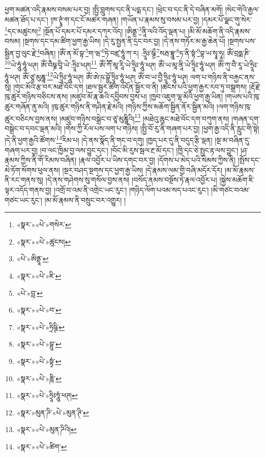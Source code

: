 ཕྱག་མཚན་འདི་རྣམས་བསམ་པར་བྱ། །སྤྱི་བླུགས་དང་ནི་པདྨ་དང་། །ཕྲེང་བ་དང་ནི་དེ་བཞིན་མགོ། །སེང་གེའི་རྒྱལ་མཚན་ཐོད་པ་དང་། །ཁ་ཊྭཱཾ་ག་དང་ངོ་མཚར་གཞན། །གཡོན་པ་རྣམས་སུ་བསམ་པར་བྱ། །དམར་པོ་ལྗང་གུ་སེར་\footnote{«སྣར་»«པེ་»གསེར་}དང་མཚུངས།\footnote{«སྣར་»«པེ་»ཚུངས།} །སྔོན་པོ་དམར་པོ་དམར་དཀར་འོད། །ཨིནྡྲ་\footnote{«པེ་»ཨིནྡཱ་}ནཱི་ལའི་འོད་ལྡན་པ། །མི་མོ་མཆོག་ནི་འདི་རྣམས་བསམ། །སྔགས་དང་དམ་ཚིག་ཕྱག་རྒྱ་ཡིས། །དེ་རུ་སྤྱན་ནི་དྲང་བར་བྱ། །དེ་ནས་གཏོར་མ་རྒྱ་ཆེན་པོ། །སྔགས་པས་སྦྱིན་བྱ་ལུང་རྗེ་\footnote{«སྣར་»«པེ་»ཇི་}བཞིན། །ཨོཾ་ན་མོ་བྷ་\footnote{«པེ་»བླ་}ག་ཝ་\footnote{«སྣར་»«པེ་»བ་}ཏེ་བཛྲ་ཧཱུཾ་ཀ་ར། :ཧྲཱིཿ་ཥྚྲྀ་\footnote{«སྣར་»«པེ་»ཧྲིཥྚི་}སརྦ་བྷཱུ་\footnote{«སྣར་»«པེ་»བྷུ་}ཏ་ནི་སྟཾ་\footnote{«སྣར་»«པེ་»སྟྭཾ་}བྷ་ཡ་སྭཱ་ཧཱ། ཨོཾ་བྲཧྨ་ཎི་\footnote{«སྣར་»«པེ་»ཎཱི་}ཡེ་ཧཱུཾ་ཧཱུཾ་ཕཊ། ཨོཾ་བཻཥྞ་བཱི་ཡེ་:ཧྲཱིཿ་ཕཊ།\footnote{«སྣར་»«པེ་»ཧྲཱིཿཧཱུཾ་ཕཊ།} ཨོཾ་ཀཽ་མཱ་རཱི་ཡེ་ཧྲཱིཿ་ཧཱུཾ་ཕཊ། ཨོཾ་ཡ་མཱ་ནཱི་ཡེ་ཧྲཱིཿ་ཧཱུཾ་ཕཊ། ཨོཾ་ཀུ་བཻ་རཱ་ཡེ་ཧྲཱིཿ་ཧཱུཾ་ཕཊ། ཨོཾ་ཙཱ་མུཎྜཱ་\footnote{«སྣར་»མུན་ཌི་«པེ་»མུན་ཊི་}ཡེ་ཧྲཱིཿ་ཧཱུཾ་ཕཊ། ཨོཾ་ཨེ་ཥ་བྷྱོ་ཧྲཱིཿ་ཧཱུཾ་ཕཊ། ཨོཾ་བ་ཡ་བྱཻ་ཧྲཱིཿ་ཧཱུཾ་ཕཊ། ལག་པ་གཉིས་ནི་བརྐྱང་ནས་སུ། །གུང་མོའི་རྩ་བར་མཐེ་བོང་དག །ཐལ་སྦྱར་ཚིག་འདོན་སྦྱོར་བ་ནི། །ཚངས་པའི་ཕྱག་རྒྱར་རབ་ཏུ་བསྒྲགས། །རྡོ་རྗེ་ཁུ་ཚུར་གཉིས་བཅིངས་ནས། །མཛུབ་མོ་རྣ་ཆའི་དབྱིབས་བྱས་པ། །ཁྱབ་འཇུག་ལྷ་མོའི་ཕྱག་རྒྱ་ཡིན། །གཡས་པའི་ཁུ་ཚུར་གཞོན་ནུ་མའི། །ཁུ་ཚུར་གཉིས་ནི་གཤིན་རྗེ་མའི། །གཉིས་ཀྱིས་མཆོག་སྦྱིན་ནོར་སྦྱིན་མའི། །ལག་གཉིས་ཁུ་ཚུར་བཅིངས་བྱས་ནས། །མཛུབ་གཉིས་བསྒྲེང་བ་ཙཱ་མུཎྜཱིའི།\footnote{«སྣར་»«པེ་»མུན་ཌིའི།} །མཐེའུ་ཆུང་མཐེ་བོང་དག་བཀུག་ནས། །གཞན་དག་བསྒྲེང་བ་དབང་ལྡན་མའི། །གོས་ཀྱི་རོལ་པས་ལག་པ་གཉིས། །སྤྱི་བོ་རུ་ནི་གཞག་པར་བྱ། །ཕྱག་རྒྱ་འདི་ནི་རླུང་གི་སྟེ། །དེ་ནི་ཕྱག་རྒྱའི་ཚོགས་\footnote{«སྣར་»«པེ་»ཚིག་}རིམ་པ། །དེ་ནས་སྣོད་ནི་གང་བ་དགུ། །ཁྱད་པར་དུ་ནི་བདུད་རྩི་ལྡན། །སྔ་མ་བཞིན་དུ་གཞག་པར་བྱ། །བ་ལང་ཁྱིམ་བྱ་ལས་བྱུང་དང་། །བོང་མི་རུས་སྦལ་རྔ་མོ་དང་། །ཁྱི་དང་ཅེ་སྤྱང་རྟ་ལས་བྱུང་། །ཤ་རྣམས་ཀྱིས་ནི་གོ་རིམས་བཞིན། །རྣལ་འབྱོར་པ་ཡིས་དགང་བར་བྱ། །དོགས་པ་མེད་པའི་སེམས་ཀྱིས་ནི། །སྤོས་དང་མེ་ཏོག་སོགས་ཕུལ་ནས། །སྔར་བཤད་སྔགས་དང་ཕྱག་རྒྱ་ཡིས། །དེ་རྣམས་ལམ་གྱི་བཞི་མདོར་དོར། །མ་མོ་རྣམས་ནི་རང་གནས་སུ། །དེ་ནས་གཤེགས་སུ་གསོལ་བྱས་ནས། །བསོད་ནམས་བསྔོས་ཏེ་རྣལ་འབྱོར་པ། །སྐྱེས་མཆོག་ཇི་ལྟར་འདོད་གནས་བྱ། །འགྲོ་བ་འམ་ནི་འགྲེང་ཡང་རུང་། །གཉིད་ལོག་པའམ་སད་པའང་རུང་། །མི་གཙང་བའམ་གཙང་ཡང་རུང་། །མ་མོ་རྣམས་ནི་བསྲུང་བར་འགྱུར། །
